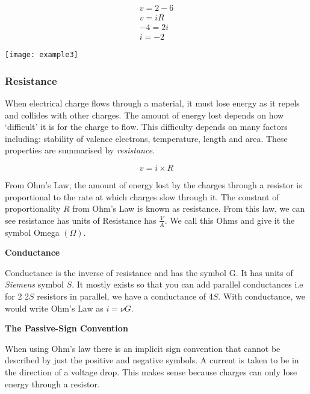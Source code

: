 \documentclass[12pt]{article}
\begin{document}
\begin{example}
  \begin{gather*}
    v = 2 - 6 \\
    v = iR \\
    -4 = 2i \\
    i = -2
  \end{gather*}
\end{example}
\begin{marginfigure}
  \vspace{ -1.5cm }
  \texttt{[image: example3]}
\end{marginfigure}

\subsubsection{Resistance}

When electrical charge flows through a material, it must lose energy as it repels and collides with other charges.
The amount of energy lost depends on how `difficult' it is for the charge to flow. 
This difficulty depends on many factors including: stability of valence electrons, temperature, length and area.
These properties are summarised by \textit{resistance}.

\begin{equation*}
  v = i \times R 
\end{equation*}


From Ohm's Law, the amount of energy lost by the charges through a resistor is proportional to the rate at which charges slow through it.
The constant of proportionality $R$ from Ohm's Law is known as resistance. 
From this law, we can see resistance has units of Resistance has $\frac{V}{A}$.
We call this Ohms and give it the symbol Omega $(\Omega)$.

\begin{theorem*}
  \textbf{Conductance}

  Conductance is the inverse of resistance and has the symbol G. 
  It has units of \textit{Siemens} symbol $S$.
  It mostly exists so that you can add parallel conductances i.e for 2 2$S$ resistors in parallel, we have a conductance of 4$S$.
  With conductance, we would write Ohm's Law as $i=\nu G$.
\end{theorem*}

\begin{definition*}
  \textbf{The Passive-Sign Convention}

  When using Ohm's law there is an implicit sign convention that cannot be described by just the positive and negative symbols.
  A current is taken to be in the direction of a voltage drop. 
  This makes sense because charges can only lose energy through a resistor.
\end{definition*}
\end{document}

